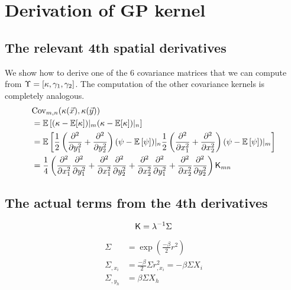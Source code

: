 \appendix 

\section{Derivation of GP kernel}
\label{app:GP_kernel_derivation}


\subsection{The relevant 4th spatial derivatives}
We show how to derive one of the 6  covariance matrices that we can compute
from $\Upsilon = [\kappa, \gamma_1, \gamma_2]$. The computation of the other
covariance kernels is completely analogous.
\begin{align*}
&{\rm Cov}_{m,n} (\kappa(\vec{x}), \kappa(\vec{y}))  \\ 
&= \mathbb{E} \left[ 
	(\kappa - \mathbb{E}[\kappa])|_m 
( \kappa - \mathbb{E}[\kappa])|_n\right] 
\\
 &=\mathbb{E}\left[
\frac{1}{2} \left(\frac{\partial^2}{\partial y_1^2} + 
\frac{\partial^2}{\partial y_2^2}\right) 
 (\psi - \mathbb{E}\left[\psi\right])|_n \frac{1}{2}
\left(\frac{\partial^2}{\partial x_1^2} + \frac{\partial^2}{\partial x_2^2} \right)
(\psi - \mathbb{E}\left[\psi\right])|_m \right]
\\
&= \frac{1}{4}\left(
\frac{\partial^2}{\partial x_1^2} \frac{\partial^2}{\partial y_1^2} + 
\frac{\partial^2}{\partial x_1^2} \frac{\partial^2}{\partial y_2^2} +  
\frac{\partial^2}{\partial x_2^2} \frac{\partial^2}{\partial y_1^2} + 
\frac{\partial^2}{\partial x_2^2} \frac{\partial^2}{\partial y_2^2}  
\right) \mathsf{K}_{mn}\\ 
\end{align*}


\subsection{The actual terms from the 4th derivatives}
\begin{equation*}
\mathsf{K} = \lambda^{-1} \Sigma 
\end{equation*}

\begin{align}
\Sigma &= \exp{\left(\frac{-\beta}{2} r^2 \right)}\\
\Sigma_{,x_i} &= \frac{-\beta}{2} \Sigma r^2_{,x_i} = -\beta \Sigma X_i\\ 
\Sigma_{,y_h} &= \beta \Sigma X_h 
\end{align}

